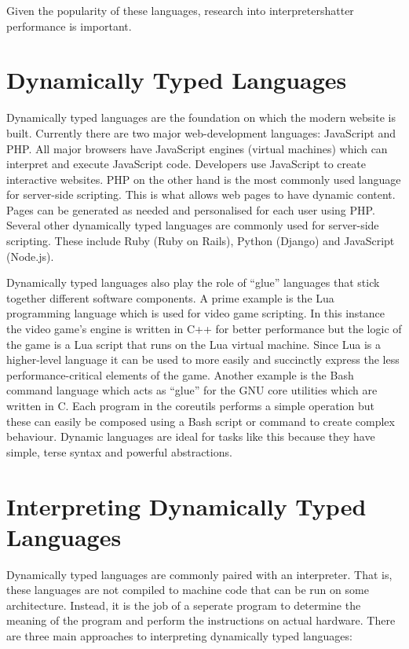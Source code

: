 \documentclass[english,a4paper]{report}
\begin{document}
Given the popularity of these languages, research into interpretershatter
performance is important.

\section{Dynamically Typed Languages}
Dynamically typed languages are the foundation on which the modern
website is built. Currently there are two major web-development
languages: JavaScript and PHP. All major browsers have JavaScript
engines (virtual machines) which can interpret and execute JavaScript
code. Developers use JavaScript to create interactive websites. PHP on
the other hand is the most commonly used language for server-side
scripting. This is what allows web pages to have dynamic
content. Pages can be generated as needed and personalised for each
user using PHP. Several other dynamically typed languages are commonly
used for server-side scripting. These include Ruby (Ruby on Rails),
Python (Django) and JavaScript (Node.js).

Dynamically typed languages also play the role of ``glue'' languages
that stick together different software components. A prime example is
the Lua programming language which is used for video game
scripting. In this instance the video game's engine is written in C++
for better performance but the logic of the game is a Lua script that
runs on the Lua virtual machine. Since Lua is a higher-level language
it can be used to more easily and succinctly express the less
performance-critical elements of the game. Another example is the Bash
command language which acts as ``glue'' for the GNU core utilities
which are written in C. Each program in the coreutils performs a
simple operation but these can easily be composed using a Bash script
or command to create complex behaviour. Dynamic languages are ideal
for tasks like this because they have simple, terse syntax and
powerful abstractions.

\section{Interpreting Dynamically Typed Languages}
Dynamically typed languages are commonly paired with an
interpreter. That is, these languages are not compiled to machine code
that can be run on some architecture. Instead, it is the job of a
seperate program to determine the meaning of the program and perform
the instructions on actual hardware. There are three main approaches
to interpreting dynamically typed languages:
\end{document}

